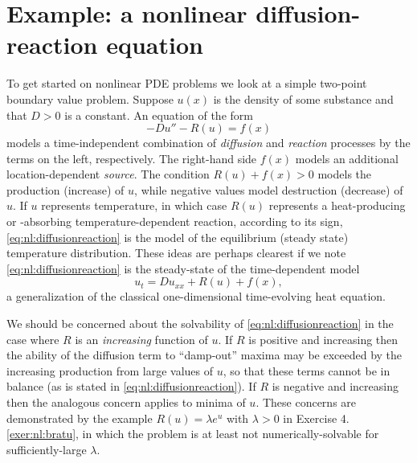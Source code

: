 \section{Example: a nonlinear diffusion-reaction equation}

To get started on nonlinear PDE problems we look at a simple two-point boundary value problem.  Suppose $u(x)$ is the density of some substance and that $D>0$ is a constant.  An equation of the form
\begin{equation}
- D u'' - R(u) = f(x)  \label{eq:nl:diffusionreaction}
\end{equation}
models a time-independent combination of \emph{diffusion} and \emph{reaction} processes by the terms on the left, respectively.  The right-hand side $f(x)$ models an additional location-dependent \emph{source}.  The condition $R(u)+f(x)>0$ models the production (increase) of $u$, while negative values model destruction (decrease) of $u$.  If $u$ represents temperature, in which case $R(u)$ represents a heat-producing or -absorbing temperature-dependent reaction, according to its sign, \eqref{eq:nl:diffusionreaction} is the model of the equilibrium (steady state) temperature distribution.  These ideas are perhaps clearest if we note \eqref{eq:nl:diffusionreaction} is the steady-state of the time-dependent model
\begin{equation}
u_t = D u_{xx} + R(u) + f(x),  \label{eq:nl:drtimedependent}
\end{equation}
a generalization of the classical one-dimensional time-evolving heat equation.

We should be concerned about the solvability of \eqref{eq:nl:diffusionreaction} in the case where $R$ is an \emph{increasing} function of $u$.  If $R$ is positive and increasing then the ability of the diffusion term to ``damp-out'' maxima may be exceeded by the increasing production from large values of $u$, so that these terms cannot be in balance (as is stated in \eqref{eq:nl:diffusionreaction}).  If $R$ is negative and increasing then the analogous concern applies to minima of $u$.  These concerns are demonstrated by the example $R(u) = \lambda e^u$ with $\lambda>0$ in Exercise 4.\ref{exer:nl:bratu}, in which the problem is at least not numerically-solvable for sufficiently-large $\lambda$.  

